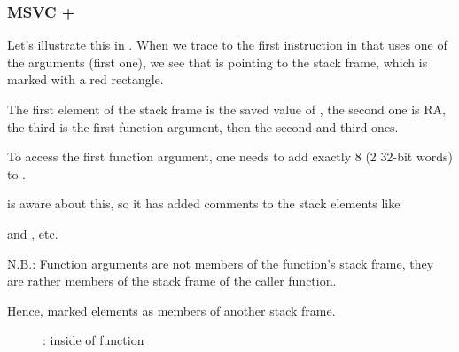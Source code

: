 \subsubsection{MSVC + \olly}
\myindex{\olly}
Let's illustrate this in \olly.
When we trace to the first instruction in \ttf that uses one of the arguments 
(first one), we see that \EBP is pointing to the \gls{stack frame}, 
which is marked with a red rectangle.

The first element of the \gls{stack frame} is the saved value of \EBP, 
the second one is \ac{RA}, the third is the first function argument, then the second and third ones.

To access the first function argument, one needs to add exactly 8 (2 32-bit words) to \EBP.

\olly is aware about this, so it has added comments to the stack elements like

 and , etc.

N.B.: Function arguments are not members of the function's stack frame, they are rather
members of the stack frame of the \gls{caller} function.

Hence, \olly marked  elements as members of another stack frame.

\begin{figure}[H]
\centering
{}
\caption{\olly: inside of \ttf{} function}
\label{fig:passing_arguments_olly}
\end{figure}


